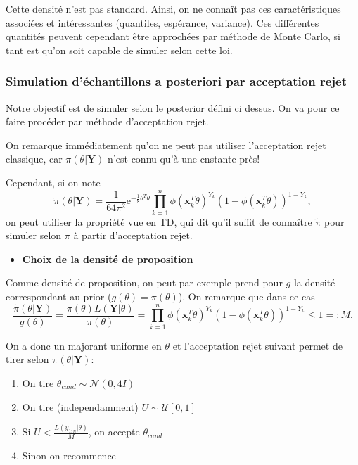\documentclass[]{article}
\providecommand{\tightlist}{%
  \setlength{\itemsep}{0pt}\setlength{\parskip}{0pt}}
\begin{document}
Cette densité n'est pas standard. Ainsi, on ne connaît pas ces
caractéristiques associées et intéressantes (quantiles, espérance,
variance). Ces différentes quantités peuvent cependant être approchées
par méthode de Monte Carlo, si tant est qu'on soit capable de simuler
selon cette loi.

\hypertarget{simulation-duxe9chantillons-a-posteriori-par-acceptation-rejet}{%
\subsubsection{Simulation d'échantillons a posteriori par acceptation
rejet}\label{simulation-duxe9chantillons-a-posteriori-par-acceptation-rejet}}

Notre objectif est de simuler selon le posterior défini ci dessus. On va
pour ce faire procéder par méthode d'acceptation rejet.

On remarque immédiatement qu'on ne peut pas utiliser l'acceptation rejet
classique, car \(\pi(\theta \vert \mathbf{Y})\) n'est connu qu'à une
cnstante près!

Cependant, si on note
\[\tilde{\pi}(\theta \vert \mathbf{Y}) = \frac{1}{64\pi^2}\text{e}^{-\frac{1}{8}\theta^T\theta} \prod_{k = 1}^n \phi(\mathbf{x}_k^T\theta)^{Y_k} (1 - \phi(\mathbf{x}_k^T\theta))^{1 - Y_k},\]
on peut utiliser la propriété vue en TD, qui dit qu'il suffit de
connaître \(\tilde{\pi}\) pour simuler selon \(\pi\) à partir
d'acceptation rejet.

\begin{itemize}
\tightlist
\item
  \textbf{Choix de la densité de proposition}
\end{itemize}

Comme densité de proposition, on peut par exemple prend pour \(g\) la
densité correspondant au prior (\(g(\theta) = \pi(\theta)\)). On
remarque que dans ce cas
\[\frac{\tilde{\pi}(\theta \vert \mathbf{Y})}{g(\theta)} = \frac{\pi(\theta)L(\mathbf{Y}\vert \theta)}{\pi(\theta)} = \prod_{k = 1}^n \phi(\mathbf{x}_k^T\theta)^{Y_k} (1 - \phi(\mathbf{x}_k^T\theta))^{1 - Y_k} \leq 1 =:M.\]

On a donc un majorant uniforme en \(\theta\) et l'acceptation rejet
suivant permet de tirer selon \(\pi(\theta \vert \mathbf{Y})\):

\begin{enumerate}
\def\labelenumi{\arabic{enumi}.}
\tightlist
\item
  On tire \(\theta_{cand} \sim \mathcal{N}(0, 4I)\)
\item
  On tire (independamment) \(U\sim \mathcal{U}[0, 1]\)
\item
  Si \(U < \frac{L(y_{1:n}\vert \theta)}{M}\), on accepte
  \(\theta_{cand}\)
\item
  Sinon on recommence
\end{enumerate}
\end{document}
